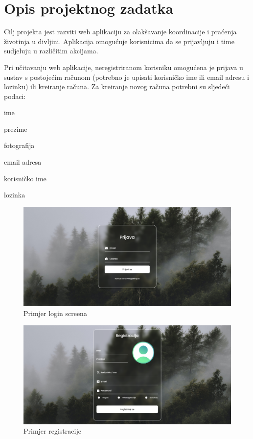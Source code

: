 \chapter{Opis projektnog zadatka}
		
		Cilj projekta jest razviti web aplikaciju za olakšavanje koordinacije i praćenja životinja u divljini. Aplikacija omogućuje korisnicima da se prijavljuju i time sudjeluju u različitim akcijama.
		
		Pri učitavanju web aplikacije, neregistriranom korisniku omogućena je prijava u sustav s postojećim računom (potrebno je upisati korisničko ime ili email adresu i lozinku) ili kreiranje računa. Za kreiranje novog računa potrebni su sljedeći podaci:
		\begin{packed_item}
			\item ime
			\item prezime
			\item fotografija
			\item email adresa
			\item korisničko ime
			\item lozinka
		\end{packed_item}
		
		\begin{figure}[H]
			\includegraphics[scale=0.7]{slike/login_screen.PNG} %
			\centering
			\caption{Primjer login screena}
			\label{fig:promjene}
		\end{figure}
		
		\begin{figure}[H]
			\includegraphics[scale=0.7]{slike/login_screen2.PNG} %
			\centering
			\caption{Primjer registracije}
			\label{fig:promjene}
		\end{figure}
		
